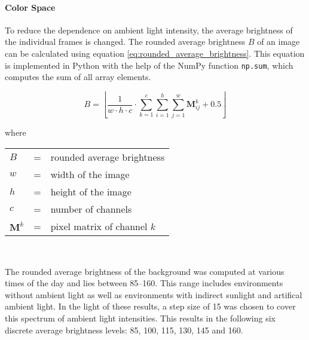 \paragraph{Color Space}
To reduce the dependence on ambient light intensity, the average brightness of the individual frames is changed.
The rounded average brightness $B$ of an image can be calculated using equation \ref{eq:rounded_average_brightness}.
This equation is implemented in Python with the help of the NumPy function \texttt{np.sum}, which computes the sum of all array elements. %

\begin{equation}
  B = \left\lfloor\frac{1}{w\cdot h\cdot c} \cdot \sum\limits_{k=1}^c \sum\limits_{i=1}^h \sum\limits_{j=1}^w \boldsymbol{M}_{ij}^{k} + 0.5\right\rfloor
  \label{eq:rounded_average_brightness}
\end{equation}

where

\begin{tabular}{lll}
  $B$ & = & rounded average brightness \\
  $w$ & = & width of the image \\
  $h$ & = & height of the image \\
  $c$ & = & number of channels \\
  $\boldsymbol{M}^k$ & = & pixel matrix of channel $k$ \\
\end{tabular}
\\

\clearpage %

The rounded average brightness of the background was computed at various times of the day and lies between \numrange{85}{160}.
This range includes environments without ambient light as well as environments with indirect sunlight and artifical ambient light.
In the light of these results, a step size of \num{15} was chosen to cover this spectrum of ambient light intensities.
This results in the following six discrete average brightness levels: \num{85}, \num{100}, \num{115}, \num{130}, \num{145} and \num{160}.

